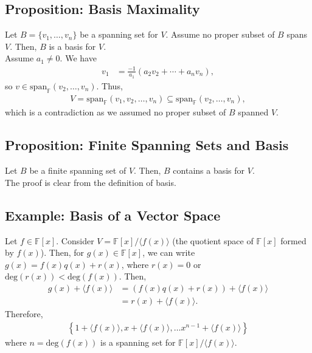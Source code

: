 \documentclass[10pt]{extarticle}
\begin{document}
  \subsection{Proposition: Basis Maximality}%
  Let $B = \{v_1,\dots,v_n\}$ be a spanning set for $V$. Assume no proper subset of $B$ spans $V$. Then, $B$ is a basis for $V$.\\

  Assume $a_1\neq 0$. We have
  \begin{align*}
    v_1 &= \frac{-1}{a_1}\left(a_2v_2 + \cdots + a_nv_n\right),
  \end{align*}
  so $v\in \text{span}_{\mathbb{F}}(v_2,\dots,v_n)$. Thus,
  \begin{align*}
    V = \text{span}_{\mathbb{F}}\left(v_1,v_2,\dots,v_n\right) \subseteq \text{span}_{\mathbb{F}}(v_2,\dots,v_n),
  \end{align*}
  which is a contradiction as we assumed no proper subset of $B$ spanned $V$.
  \subsection{Proposition: Finite Spanning Sets and Basis}%
  Let $B$ be a finite spanning set of $V$. Then, $B$ contains a basis for $V$.\\

  The proof is clear from the definition of basis.
  \subsection{Example: Basis of a Vector Space}%
  Let $f\in \mathbb{F}[x]$. Consider $V = \mathbb{F}[x]/\langle f(x)\rangle$ (the quotient space of $\mathbb{F}[x]$ formed by $f(x)$). Then, for $g(x)\in \mathbb{F}[x]$, we can write $g(x) = f(x)q(x) + r(x)$, where $r(x) = 0$ or $\text{deg}(r(x)) < \text{deg}(f(x))$. Then,
  \begin{align*}
    g(x) + \langle f(x) \rangle &= \left(f(x)q(x) + r(x)\right) + \langle f(x) \rangle\\
                                &= r(x) + \langle f(x) \rangle.
  \end{align*}
  Therefore,
  \begin{align*}
    \left\{1 + \langle f(x) \rangle, x + \langle f(x) \rangle, \dots x^{n-1} + \langle f(x) \rangle \right\}
  \end{align*}
  where $n = \text{deg}(f(x))$ is a spanning set for $\mathbb{F}[x]/\langle f(x)\rangle$.\\
\end{document}
